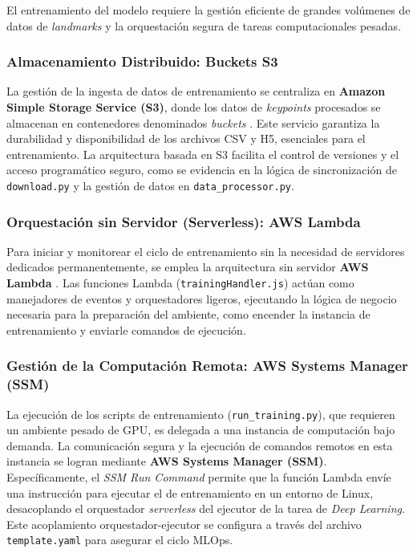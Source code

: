 El entrenamiento del modelo requiere la gestión eficiente de grandes volúmenes de datos de \textit{landmarks} y la orquestación segura de tareas computacionales pesadas.

\subsubsection{Almacenamiento Distribuido: Buckets S3}
La gestión de la ingesta de datos de entrenamiento se centraliza en \textbf{Amazon Simple Storage Service (S3)}, donde los datos de \textit{keypoints} procesados se almacenan en contenedores denominados \textit{buckets} \cite{ref45}. Este servicio garantiza la durabilidad y disponibilidad de los archivos CSV y H5, esenciales para el entrenamiento. La arquitectura basada en S3 facilita el control de versiones y el acceso programático seguro, como se evidencia en la lógica de sincronización de \texttt{download.py} y la gestión de datos en \texttt{data\_processor.py}.

\subsubsection{Orquestación sin Servidor (Serverless): AWS Lambda}
Para iniciar y monitorear el ciclo de entrenamiento sin la necesidad de servidores dedicados permanentemente, se emplea la arquitectura sin servidor \textbf{AWS Lambda} \cite{ref46}. Las funciones Lambda (\texttt{trainingHandler.js}) actúan como manejadores de eventos y orquestadores ligeros, ejecutando la lógica de negocio necesaria para la preparación del ambiente, como encender la instancia de entrenamiento y enviarle comandos de ejecución.

\subsubsection{Gestión de la Computación Remota: AWS Systems Manager (SSM)}
La ejecución de los scripts de entrenamiento (\texttt{run\_training.py}), que requieren un ambiente pesado de GPU, es delegada a una instancia de computación bajo demanda. La comunicación segura y la ejecución de comandos remotos en esta instancia se logran mediante \textbf{AWS Systems Manager (SSM)}. Específicamente, el \textit{SSM Run Command} permite que la función Lambda envíe una instrucción para ejecutar el \textitscript de entrenamiento en un entorno de Linux, desacoplando el orquestador \textit{serverless} del ejecutor de la tarea de \textit{Deep Learning}. Este acoplamiento orquestador-ejecutor se configura a través del archivo \texttt{template.yaml} para asegurar el ciclo MLOps.


